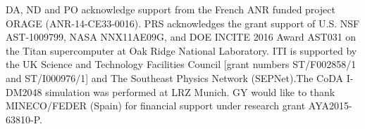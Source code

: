 \documentclass[twocolumn]{aastex61}
\begin{document}








\acknowledgments
DA, ND and PO acknowledge support from the French ANR funded project ORAGE (ANR-14-CE33-0016). PRS acknowledges the grant support of U.S. NSF AST-1009799, NASA NNX11AE09G, and DOE INCITE 2016 Award AST031 on the Titan supercomputer at Oak Ridge National Laboratory. ITI is supported by the UK Science and Technology Facilities Council [grant numbers ST/F002858/1 and ST/I000976/1] and The Southeast Physics Network (SEPNet).The CoDA I-DM2048 simulation was performed at LRZ Munich. GY would like to thank MINECO/FEDER (Spain) for financial support under research grant AYA2015-63810-P.
\end{document}
